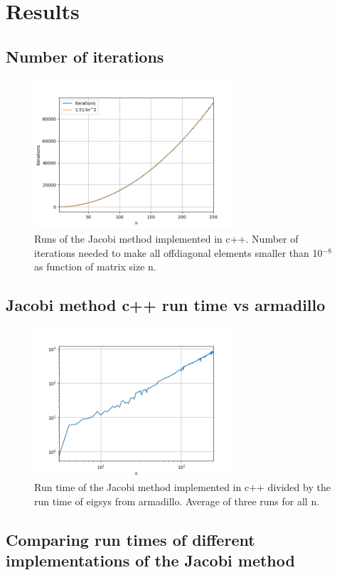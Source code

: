 \section{Results}


\subsection{Number of iterations}

\begin{figure}[htp]
  \centering
  \includegraphics[width=0.66\textwidth]{../figures/iterations.png}

  \caption{Runs of the Jacobi method implemented in c++. Number of iterations
  needed to make all offdiagonal elements smaller than 10$^{-8}$ as function of
  matrix size n.}

  \label{fig:iterations}
\end{figure}


\subsection{Jacobi method c++ run time vs armadillo}

\begin{figure}[htp]
  \centering
  \includegraphics[width=0.66\textwidth]{../figures/compare_arma_cpp.png}

  \caption{Run time of the Jacobi method implemented in c++ divided by the run time of eigsys
  from armadillo. Average of three runs for all n.}

  \label{fig:cpp_arma}
\end{figure}




\subsection{Comparing run times of different implementations of the Jacobi method}
